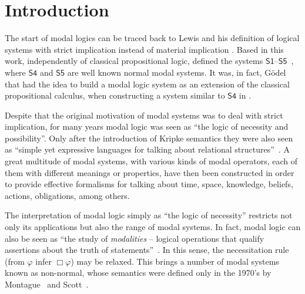 \documentclass[sigconf]{acmart}
\begin{document}


\maketitle

\section{Introduction}\label{sec:intro}


The start of modal logics can be traced back to Lewis and his definition of 
logical systems with strict implication instead of material implication \cite{Lewis1918}.
Based in this work, independently of classical propositional logic,
defined the systems $\mathsf{S1}$--$\mathsf{S5}$~\cite{Lewis1932}, where $\mathsf{S4}$ and $\mathsf{S5}$
are well known normal modal systems. It was, in fact, G{\"o}del that had the idea 
to build a modal logic system as an extension of the classical propositional calculus, 
when constructing a system similar to $\mathsf{S4}$ in \cite{Godel1933}.

Despite that the original motivation of modal systems was to deal with strict implication, 
for many years modal logic was seen as ``the logic of necessity and possibility''. 
Only after the introduction of Kripke semantics they were also seen as ``simple yet
expressive languages for talking about relational structures''~\cite{Blackburn-ModalLogics}. 
A great multitude of modal systems, with various kinds of modal operators, each of them with 
different meanings or properties, have then been constructed in order to provide effective
formalisms for talking about time, space, knowledge, beliefs, actions, 
obligations, among others.

The interpretation of modal logic simply as ``the logic of necessity'' restricts 
not only its applications but also the range of modal systems. In fact, modal logic 
can also be seen as ``the study of \emph{modalities} -- logical operations that qualify 
assertions about the truth of statements''~\cite{Goldblatt-MathofModality}. In this sense, 
the necessitation rule (from $\varphi$ infer $\Box\varphi$) may be relaxed. This brings 
a number of modal systems known as non-normal, whose semantics were defined only in the 
1970's by Montague~\cite{Montague1970} and Scott~\cite{Scott_AdviceModal1970}.
\end{document}
